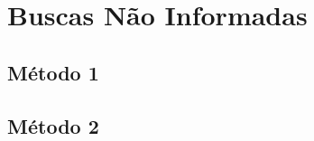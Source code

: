 \section{Buscas Não Informadas}
\label{sec:busca-nao-informada}

\lipsum[8]

\subsection{Método 1}
\label{subsec:metodo-1}
\lipsum[9]

\subsection{Método 2}
\label{subsec:metodo-2}
\lipsum[10]

